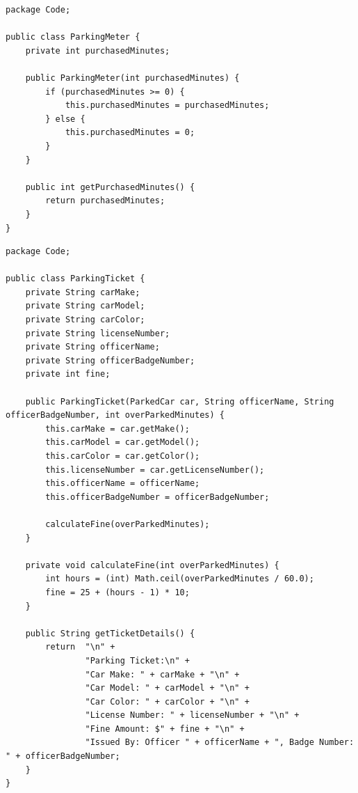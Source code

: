\documentclass{article}
\begin{document}
\begin{lstlisting}[caption=ParkingMeter.java]
package Code;

public class ParkingMeter {
    private int purchasedMinutes;

    public ParkingMeter(int purchasedMinutes) {
        if (purchasedMinutes >= 0) {
            this.purchasedMinutes = purchasedMinutes;
        } else {
            this.purchasedMinutes = 0;
        }
    }

    public int getPurchasedMinutes() {
        return purchasedMinutes;
    }
}
\end{lstlisting}

\begin{lstlisting}[caption=ParkingTicket.java]
package Code;

public class ParkingTicket {
    private String carMake;
    private String carModel;
    private String carColor;
    private String licenseNumber;
    private String officerName;
    private String officerBadgeNumber;
    private int fine;

    public ParkingTicket(ParkedCar car, String officerName, String officerBadgeNumber, int overParkedMinutes) {
        this.carMake = car.getMake();
        this.carModel = car.getModel();
        this.carColor = car.getColor();
        this.licenseNumber = car.getLicenseNumber();
        this.officerName = officerName;
        this.officerBadgeNumber = officerBadgeNumber;

        calculateFine(overParkedMinutes);
    }

    private void calculateFine(int overParkedMinutes) {
        int hours = (int) Math.ceil(overParkedMinutes / 60.0);
        fine = 25 + (hours - 1) * 10;
    }

    public String getTicketDetails() {
        return  "\n" +
                "Parking Ticket:\n" +
                "Car Make: " + carMake + "\n" +
                "Car Model: " + carModel + "\n" +
                "Car Color: " + carColor + "\n" +
                "License Number: " + licenseNumber + "\n" +
                "Fine Amount: $" + fine + "\n" +
                "Issued By: Officer " + officerName + ", Badge Number: " + officerBadgeNumber;
    }
}
\end{lstlisting}
\end{document}
